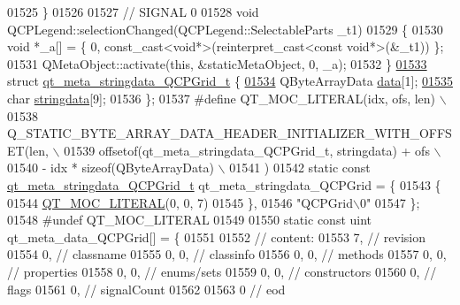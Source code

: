 \begin{DoxyCode}
01525 \}
01526 
01527 \textcolor{comment}{// SIGNAL 0}
01528 \textcolor{keywordtype}{void} QCPLegend::selectionChanged(QCPLegend::SelectableParts \_t1)
01529 \{
01530     \textcolor{keywordtype}{void} *\_a[] = \{ 0, \textcolor{keyword}{const\_cast<}\textcolor{keywordtype}{void}*\textcolor{keyword}{>}(\textcolor{keyword}{reinterpret\_cast<}\textcolor{keyword}{const }\textcolor{keywordtype}{void}*\textcolor{keyword}{>}(&\_t1)) \};
01531     QMetaObject::activate(\textcolor{keyword}{this}, &staticMetaObject, 0, \_a);
01532 \}
\hypertarget{a00016_source_l01533}{}\hyperlink{a00016}{01533} \textcolor{keyword}{struct }\hyperlink{a00016_d0/dc2/a00104}{qt\_meta\_stringdata\_QCPGrid\_t} \{
\hypertarget{a00016_source_l01534}{}\hyperlink{a00016_a7e6e5bd7ca3eb3f18073d11e635e5cb9}{01534}     QByteArrayData \hyperlink{a00016_a7e6e5bd7ca3eb3f18073d11e635e5cb9}{data}[1];
\hypertarget{a00016_source_l01535}{}\hyperlink{a00016_a0bcd248c91a252f9ad93a353181ea07e}{01535}     \textcolor{keywordtype}{char} \hyperlink{a00016_a0bcd248c91a252f9ad93a353181ea07e}{stringdata}[9];
01536 \};
01537 \textcolor{preprocessor}{#define QT\_MOC\_LITERAL(idx, ofs, len) \(\backslash\)}
01538 \textcolor{preprocessor}{    Q\_STATIC\_BYTE\_ARRAY\_DATA\_HEADER\_INITIALIZER\_WITH\_OFFSET(len, \(\backslash\)}
01539 \textcolor{preprocessor}{    offsetof(qt\_meta\_stringdata\_QCPGrid\_t, stringdata) + ofs \(\backslash\)}
01540 \textcolor{preprocessor}{        - idx * sizeof(QByteArrayData) \(\backslash\)}
01541 \textcolor{preprocessor}{    )}
01542 \textcolor{keyword}{static} \textcolor{keyword}{const} \hyperlink{a00016_d0/dc2/a00104}{qt\_meta\_stringdata\_QCPGrid\_t} qt\_meta\_stringdata\_QCPGrid = \{
01543     \{
01544 \hyperlink{a00016_a75bb9482d242cde0a06c9dbdc6b83abe}{QT\_MOC\_LITERAL}(0, 0, 7)
01545     \},
01546     \textcolor{stringliteral}{"QCPGrid\(\backslash\)0"}
01547 \};
01548 \textcolor{preprocessor}{#undef QT\_MOC\_LITERAL}
01549 
01550 \textcolor{keyword}{static} \textcolor{keyword}{const} uint qt\_meta\_data\_QCPGrid[] = \{
01551 
01552  \textcolor{comment}{// content:}
01553        7,       \textcolor{comment}{// revision}
01554        0,       \textcolor{comment}{// classname}
01555        0,    0, \textcolor{comment}{// classinfo}
01556        0,    0, \textcolor{comment}{// methods}
01557        0,    0, \textcolor{comment}{// properties}
01558        0,    0, \textcolor{comment}{// enums/sets}
01559        0,    0, \textcolor{comment}{// constructors}
01560        0,       \textcolor{comment}{// flags}
01561        0,       \textcolor{comment}{// signalCount}
01562 
01563        0        \textcolor{comment}{// eod}

\end{DoxyCode}
